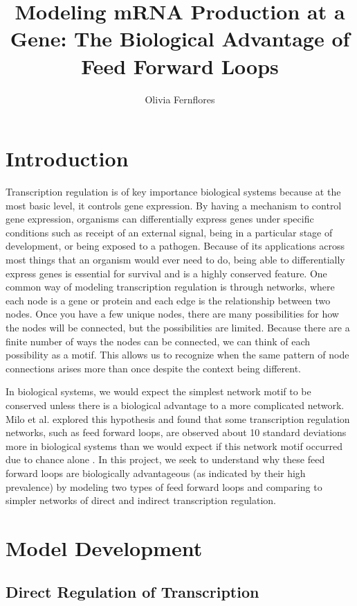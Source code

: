 \documentclass{article}
\title{Modeling mRNA Production at a Gene: The Biological Advantage of Feed Forward Loops}
\author{Olivia Fernflores}
\begin{document}
\maketitle

\section{Introduction}
Transcription regulation is of key importance biological systems because at the most basic level, it controls gene expression. By having a mechanism to control gene expression, organisms can differentially express genes under specific conditions such as receipt of an external signal, being in a particular stage of development, or being exposed to a pathogen. Because of its applications across most things that an organism would ever need to do, being able to differentially express genes is essential for survival and is a highly conserved feature. One common way of modeling transcription regulation is through networks, where each node is a gene or protein and each edge is the relationship between two nodes. Once you have a few unique nodes, there are many possibilities for how the nodes will be connected, but the possibilities are limited. Because there are a finite number of ways the nodes can be connected, we can think of each possibility as a motif. This allows us to recognize when the same pattern of node connections arises more than once despite the context being different. 

In biological systems, we would expect the simplest network motif to be conserved unless there is a biological advantage to a more complicated network. Milo et al. explored this hypothesis and found that some transcription regulation networks, such as feed forward loops, are observed about 10 standard deviations more in biological systems than we would expect if this network motif occurred due to chance alone \cite{Milo2002}. In this project, we seek to understand why these feed forward loops are biologically advantageous (as indicated by their high prevalence) by modeling two types of feed forward loops and comparing to simpler networks of direct and indirect transcription regulation. 

\section{Model Development}

\subsection{Direct Regulation of Transcription}
\end{document}
